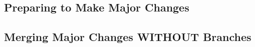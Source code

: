 
   


      
      

\subsection{Preparing to Make Major Changes}


\subsection{Merging Major Changes WITHOUT Branches}

